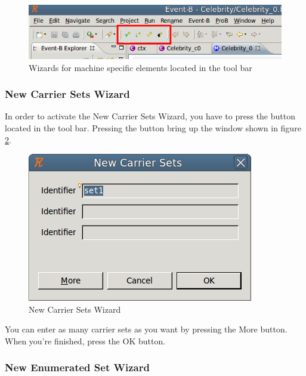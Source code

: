 \begin{figure}[!h]
\begin{center}
	\includegraphics{img/reference/ref_01_eventb_editor13.png}
	\caption{Wizards for machine specific elements located in the tool bar}
	\label{fig_ref_01_eventb_editor13}
\end{center}
\end{figure}


\subsubsection{New Carrier Sets Wizard}

In order to activate the \textsf{New Carrier Sets Wizard}, you have to press the  button located in the tool bar. Pressing the button bring up the window shown in figure \ref{fig_ref_01_eventb_editor4}.

\begin{figure}[!h]
\begin{center}
	\includegraphics{img/reference/ref_01_eventb_editor4.png}
	\caption{New Carrier Sets Wizard}
	\label{fig_ref_01_eventb_editor4}
\end{center}
\end{figure}

You can enter as many carrier sets as you want by pressing the \textsf{More} button. When you’re finished, press the \textsf{OK} button. 

\subsubsection{New Enumerated Set Wizard}

